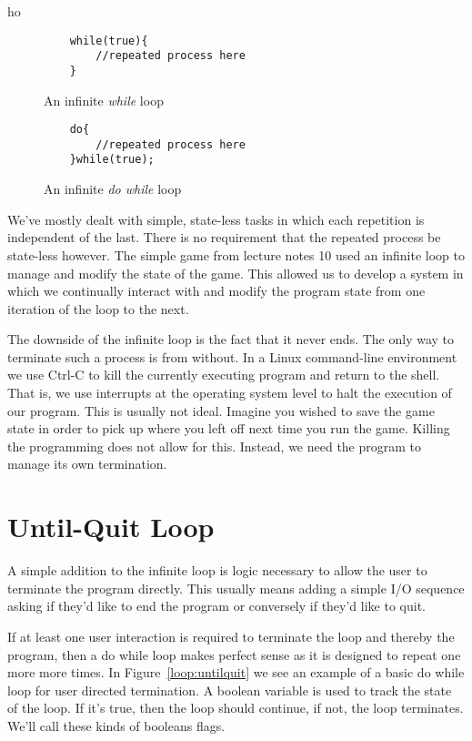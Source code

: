 ho\documentclass[]{tufte-handout}
\begin{document}
\begin{figure}
\begin{lstlisting}
	while(true){
		//repeated process here
	}
\end{lstlisting}
\label{loop:infWhile}
\caption{An infinite \textit{while} loop}
\end{figure}

\begin{figure}
  \begin{lstlisting}
  	do{
  		//repeated process here
  	}while(true);
  \end{lstlisting}
\caption{An infinite \textit{do while} loop}
\label{loop:infDoWhile}
\end{figure}

We've mostly dealt with simple, state-less tasks in which each repetition is independent of the last. There is no requirement that the repeated process be state-less however.  The simple game from lecture notes 10 used an infinite loop to manage and modify the state of the game.  This allowed us to develop a system in which we continually interact with and modify the program state from one iteration of the loop to the next.

The downside of the infinite loop is the fact that it never ends. The only way to terminate such a process is from without. In a Linux command-line environment we use Ctrl-C to kill the currently executing program and return to the shell. That is, we use interrupts at the operating system level to halt the execution of our program. This is usually not ideal. Imagine you wished to save the game state in order to pick up where you left off next time you run the game. Killing the programming does not allow for this. Instead, we need the program to manage its own termination.

\section{Until-Quit Loop}

A simple addition to the infinite loop is logic necessary to allow the user to terminate the program directly. This usually means adding a simple I/O sequence asking if they'd like to end the program or conversely if they'd like to quit.

If at least one user interaction is required to terminate the loop and thereby the program, then a do while loop makes perfect sense as it is designed to repeat one more more times.  In Figure~\ref{loop:untilquit} we see an example of a basic do while loop for user directed termination. A boolean variable is used to track the state of the loop. If it's true, then the loop should continue, if not, the loop terminates. We'll call these kinds of booleans flags.
\end{document}
